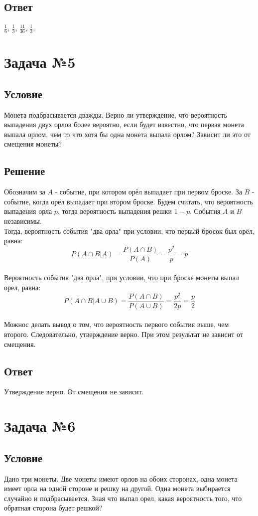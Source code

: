 \documentclass{article}
\begin{document}
\subsection*{Ответ}
$\frac{1}{6}$, $\frac{1}{3}$, $\frac{11}{36}$, $\frac{1}{3}$,
\section*{Задача №5}
\subsection*{Условие}
Монета подбрасывается дважды. Верно ли утверждение, что вероятность
выпадения двух орлов более вероятно, если будет известно, что первая монета
выпала орлом, чем то что хотя бы одна монета выпала орлом? Зависит ли это от
смещения монеты? 
\subsection*{Решение}
Обозначим за $A$ - событие, при котором орёл выпадает при первом броске. За $B$ - событие, когда орёл выпадает при втором броске. Будем считать, что вероятность выпадения орла $p$, тогда вероятность выпадения решки $1-p$. События $A$ и $B$ независимы. \\
Тогда, вероятность события "два орла" при условии, что первый бросок был орёл, равна:\\
\[
    P(A \cap B|A) = \frac{P(A\cap B)}{P(A)} = \frac{p^2}{p} = p 
\]\\
Вероятность события "два орла", при условии, что при броске монеты выпал орел, равна:\\
\[
    P(A \cap B| A \cup B) = \frac{P(A \cap B)}{P(A \cup B)} = \frac{p^2}{2p} = \frac{p}{2}
\]\\
Можнос делать вывод о том, что вероятность первого события выше, чем второго. Следовательно, утверждение верно. При этом результат не зависит от смещения. 
\subsection*{Ответ}
Утверждение верно. От смещения не зависит.
\section*{Задача №6}
\subsection*{Условие}
Дано три монеты. Две монеты имеют орлов на обоих сторонах, одна монета
имеет орла на одной стороне и решку на другой. Одна монета выбирается случайно и
подбрасывается. Зная что выпал орел, какая вероятность того, что обратная сторона
будет решкой?
\end{document}

